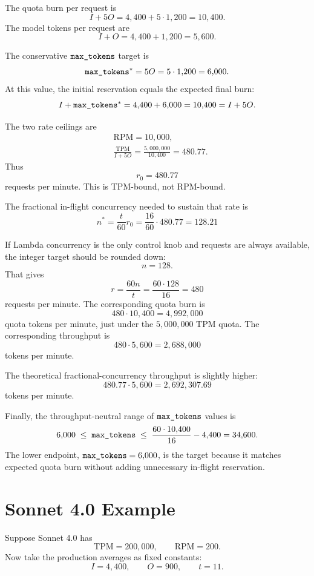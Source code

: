 \documentclass[12pt]{extarticle}
\newcommand{\maxtok}{\text{\texttt{max\_tokens}}}
\newcommand{\inputtokens}{I}
\newcommand{\outputtokens}{O}
\newcommand{\TPM}{\text{TPM}}
\newcommand{\RPM}{\text{RPM}}
\begin{document}
The quota burn per request is
\[
\inputtokens + 5\outputtokens
= 4{,}400 + 5 \cdot 1{,}200
= 10{,}400.
\]
The model tokens per request are
\[
\inputtokens + \outputtokens
= 4{,}400 + 1{,}200
= 5{,}600.
\]

The conservative $\maxtok$ target is
\[
\maxtok^* = 5\outputtokens = 5 \cdot 1{,}200 = 6{,}000.
\]
At this value, the initial reservation equals the expected final burn:
\[
\inputtokens + \maxtok^*
= 4{,}400 + 6{,}000
= 10{,}400
= \inputtokens + 5\outputtokens.
\]

The two rate ceilings are
\[
\begin{aligned}
&\RPM = 10{,}000,\\
&\frac{\TPM}{\inputtokens + 5\outputtokens}
=
\frac{5{,}000{,}000}{10{,}400}
=
480.77.
\end{aligned}
\]
Thus
\[
r_0 = 480.77
\]
requests per minute. This is TPM-bound, not RPM-bound.

The fractional in-flight concurrency needed to sustain that rate is
\[
n^*
=
\frac{t}{60}r_0
=
\frac{16}{60} \cdot 480.77
=
128.21
\]

If Lambda concurrency is the only control knob and requests are always available, the integer target should be rounded down:
\[
n = 128.
\]
That gives
\[
r = \frac{60n}{t}
  = \frac{60 \cdot 128}{16}
  = 480
\]
requests per minute. The corresponding quota burn is
\[
480 \cdot 10{,}400 = 4{,}992{,}000
\]
quota tokens per minute, just under the $5{,}000{,}000$ TPM quota. The corresponding throughput is
\[
480 \cdot 5{,}600
= 2{,}688{,}000
\]
tokens per minute.

The theoretical fractional-concurrency throughput is slightly higher:
\[
480.77 \cdot 5{,}600
=
2{,}692{,}307.69
\]
tokens per minute.

Finally, the throughput-neutral range of $\maxtok$ values is
\[
6{,}000
\;\leq\;
\maxtok
\;\leq\;
\frac{60 \cdot 10{,}400}{16} - 4{,}400
=
34{,}600.
\]
The lower endpoint, $\maxtok = 6{,}000$, is the target because it matches expected quota burn without adding unnecessary in-flight reservation.

\section{Sonnet 4.0 Example}

Suppose Sonnet 4.0 has
\[
\TPM = 200{,}000, \qquad \RPM = 200.
\]
Now take the production averages as fixed constants:
\[
\inputtokens = 4{,}400, \qquad
\outputtokens = 900, \qquad
t = 11.
\]
\end{document}
